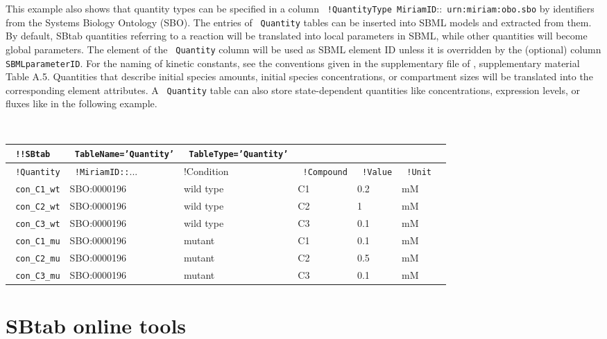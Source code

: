 \documentclass[a4paper]{article}
\newcommand{\tab}[1]{{\texttt{\color{red} #1}}}
\newcommand{\col}[1]{\texttt{\color{blue} #1}}
\newcommand{\defext}[1] {\texttt{\color{lightblue} #1}}
\newcommand{\defint}[1] {\texttt{\color{darkgreen} #1}}
\newcommand{\nick}[1] {\texttt{\color{lila} #1}}
\begin{document}
This example also shows that quantity types can be specified in a
column \col{!QuantityType MiriamID}::\defext{urn:miriam:obo.sbo} by
identifiers from the Systems Biology Ontology (SBO).  The entries of
\tab{Quantity} tables can be inserted into SBML models and extracted
from them. By default, SBtab quantities referring to a reaction will
be translated into local parameters in SBML, while other quantities
will become global parameters. The element of the \col{Quantity}
column will be used as SBML element ID unless it is overridden by the
(optional) column \col{SBMLparameterID}. For the naming of kinetic
constants, see the conventions given in the supplementary file of
\cite{liuk:10}, supplementary material Table A.5.  Quantities that
describe initial species amounts, initial species concentrations, or
compartment sizes will be translated into the corresponding element
attributes.  A \tab{Quantity} table can also store state-dependent
quantities like concentrations, expression levels, or fluxes like in
the following example.

\begin{center} {\tt \small
    \begin{tabular}{|l|l|l|l|l|l|l|}
      \hline
    \tab{!!SBtab} & \tab{TableName='Quantity'} & \tab{TableType='Quantity'}& & & \\
\hline\hline
      \col{!Quantity}    &\col{!MiriamID::}... & !Condition & \col{!Compound} &\defint{!Value}  &\col{!Unit} \\ \hline
      \nick{con\_C1\_wt}    &  SBO:0000196 & wild type & C1 & 0.2  & mM\\ \hline
      \nick{con\_C2\_wt}    &  SBO:0000196 & wild type & C2 & 1    & mM\\\hline
      \nick{con\_C3\_wt}    &  SBO:0000196 & wild type & C3 & 0.1  & mM\\\hline
      \nick{con\_C1\_mu}    &  SBO:0000196 & mutant    & C1 & 0.1  & mM\\\hline
      \nick{con\_C2\_mu}    &  SBO:0000196 & mutant    & C2 & 0.5  & mM\\\hline
      \nick{con\_C3\_mu}    &  SBO:0000196 & mutant    & C3 & 0.1  & mM\\\hline
\end{tabular}
}
\end{center}


\section{SBtab online tools}
\label{chapter5}
\end{document}
